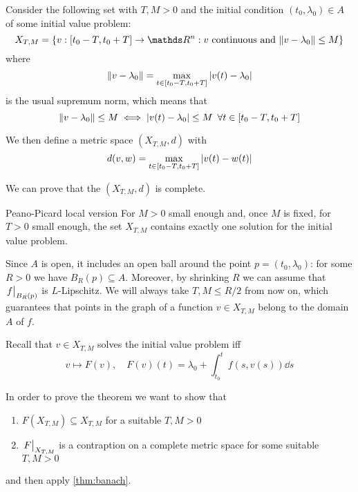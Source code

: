 \documentclass[12pt]{extarticle}
\numberwithin{equation}{section}
\begin{document}
Consider the following set with $T, M > 0$
and the initial condition $(t_0, \lambda_0) \in A$ of some initial value problem:
\begin{equation}
    X_{T, M} = \{ v: [t_0 - T, t_0 + T] \to \R^n : v \text{ continuous and } \norm{v-\lambda_0} \leq M \}
\end{equation}
where
\begin{equation}
    \norm{v-\lambda_0} = \max_{t \in [t_0 - T, t_0 + T]} \abs{v(t) - \lambda_0}
\end{equation}
is the usual supremum norm, which means that
\begin{equation}
    \norm{v - \lambda_0} \leq M \iff \abs{v(t) - \lambda_0} \leq M \enspace \forall t \in [t_0 - T, t_0 + T]
\end{equation}

We then define a metric space $(X_{T, M}, d)$ with
\begin{equation}
    d(v, w) = \max_{t \in [t_0 - T, t_0 + T]} \abs{v(t) - w(t)}
\end{equation}

We can prove that the $(X_{T,M}, d)$ is complete.

\begin{theorem}{Peano-Picard local version}{}
    For $M > 0$ small enough and, once $M$ is fixed, for $T>0$ small enough, the set $X_{T, M}$ contains exactly one solution
    for the initial value problem.
\end{theorem}

Since $A$ is open, it includes an open ball around the point $p = (t_0, \lambda_0)$:
for some $R > 0$ we have $B_R(p) \subseteq A$.
Moreover, by shrinking $R$ we can assume that $\eval{f}_{B_R(p)}$ is $L$-Lipschitz.
We will always take $T, M \leq R/2$ from now on, which guarantees that points in the graph of a function $v \in X_{T, M}$ belong to the domain $A$ of $f$.

Recall that $v \in X_{T, M}$ solves the initial value problem iff
\begin{equation}
    v \mapsto F(v), \quad F(v)(t) = \lambda_0 + \int^t_{t_0} f(s, v(s)) \dd s
\end{equation}

In order to prove the theorem we want to show that
\begin{enumerate}
    \item $F(X_{T, M}) \subseteq X_{T, M}$ for a suitable $T, M >0$
    \item $\eval{F}_{X_{T, M}}$ is a contraption on a complete metric space for some suitable $T, M > 0$
\end{enumerate}
and then apply \cref{thm:banach}.
\end{document}
